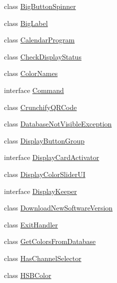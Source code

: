 \begin{DoxyCompactItemize}
\item 
class \hyperlink{classgov_1_1fnal_1_1ppd_1_1dd_1_1util_1_1BigButtonSpinner}{Big\-Button\-Spinner}
\item 
class \hyperlink{classgov_1_1fnal_1_1ppd_1_1dd_1_1util_1_1BigLabel}{Big\-Label}
\item 
class \hyperlink{classgov_1_1fnal_1_1ppd_1_1dd_1_1util_1_1CalendarProgram}{Calendar\-Program}
\item 
class \hyperlink{classgov_1_1fnal_1_1ppd_1_1dd_1_1util_1_1CheckDisplayStatus}{Check\-Display\-Status}
\item 
class \hyperlink{classgov_1_1fnal_1_1ppd_1_1dd_1_1util_1_1ColorNames}{Color\-Names}
\item 
interface \hyperlink{interfacegov_1_1fnal_1_1ppd_1_1dd_1_1util_1_1Command}{Command}
\item 
class \hyperlink{classgov_1_1fnal_1_1ppd_1_1dd_1_1util_1_1CrunchifyQRCode}{Crunchify\-Q\-R\-Code}
\item 
class \hyperlink{classgov_1_1fnal_1_1ppd_1_1dd_1_1util_1_1DatabaseNotVisibleException}{Database\-Not\-Visible\-Exception}
\item 
class \hyperlink{classgov_1_1fnal_1_1ppd_1_1dd_1_1util_1_1DisplayButtonGroup}{Display\-Button\-Group}
\item 
interface \hyperlink{interfacegov_1_1fnal_1_1ppd_1_1dd_1_1util_1_1DisplayCardActivator}{Display\-Card\-Activator}
\item 
class \hyperlink{classgov_1_1fnal_1_1ppd_1_1dd_1_1util_1_1DisplayColorSliderUI}{Display\-Color\-Slider\-U\-I}
\item 
interface \hyperlink{interfacegov_1_1fnal_1_1ppd_1_1dd_1_1util_1_1DisplayKeeper}{Display\-Keeper}
\item 
class \hyperlink{classgov_1_1fnal_1_1ppd_1_1dd_1_1util_1_1DownloadNewSoftwareVersion}{Download\-New\-Software\-Version}
\item 
class \hyperlink{classgov_1_1fnal_1_1ppd_1_1dd_1_1util_1_1ExitHandler}{Exit\-Handler}
\item 
class \hyperlink{classgov_1_1fnal_1_1ppd_1_1dd_1_1util_1_1GetColorsFromDatabase}{Get\-Colors\-From\-Database}
\item 
class \hyperlink{classgov_1_1fnal_1_1ppd_1_1dd_1_1util_1_1HasChannelSelector}{Has\-Channel\-Selector}
\item 
class \hyperlink{classgov_1_1fnal_1_1ppd_1_1dd_1_1util_1_1HSBColor}{H\-S\-B\-Color}
\item 

\end{DoxyCompactItemize}
